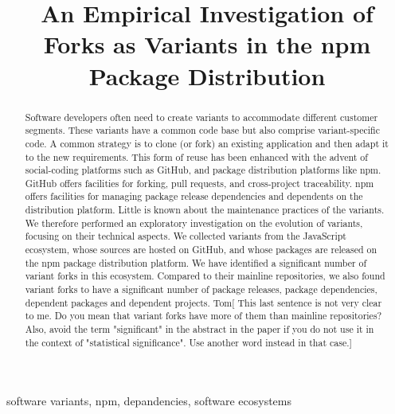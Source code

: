 \documentclass[conference]{IEEEtran}
\newcommand{\tm}[1]{{\textsf{Tom}[\smaller\sffamily\color{red} #1}]}
\newcommand{\gh}{\textsf{GitHub}\xspace}
\newcommand{\np}{\textsf{npm}\xspace}
\newcommand{\js}{\textsf{JavaScript}\xspace}
\newcommand{\npm}{{the \np package distribution platform}\xspace}
\begin{document}
\title{An Empirical Investigation of Forks as Variants in the npm Package Distribution}


\author{
	}



\maketitle

\begin{abstract}
Software developers often need to create variants to accommodate different customer segments. These variants have a common code base but also comprise  variant-specific code. A common strategy is to clone (or fork) an existing application and then adapt it to the new requirements. This form of reuse has been enhanced with the advent of social-coding platforms such as \gh, and package distribution platforms like \np. \gh offers facilities for forking, pull requests, and cross-project traceability. \np offers facilities for managing package release dependencies and dependents on the distribution platform. Little is known about the maintenance practices of the variants.
We therefore performed an exploratory investigation on the evolution of variants, focusing on their technical aspects. We collected variants from the \js ecosystem, whose sources are hosted on \gh, and whose packages are  released on \npm. We have identified a significant number of variant forks in this ecosystem. Compared to their mainline repositories, we also found variant forks to have a significant number of package releases, package dependencies, dependent packages and dependent projects.
\tm{This last sentence is not very clear to me. Do you mean that variant forks have more of them than mainline repositories? Also, avoid the term "significant" in the abstract in the paper if you do not use it in the context of "statistical significance". Use another word instead in that case.}

\end{abstract}

\begin{IEEEkeywords}
software variants, npm, depandencies, software ecosystems
\end{IEEEkeywords}













\end{document}
